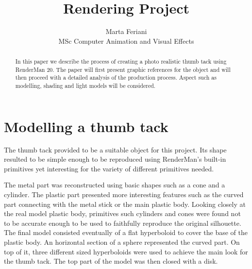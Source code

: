 \documentclass[tog]{acmsiggraph}
\title{Rendering Project}
\author{Marta Feriani\\MSc Computer Animation and Visual Effects}
\begin{document}


\maketitle

\begin{abstract}

In this paper we describe the process of creating a photo realistic thumb tack using RenderMan 20. The paper will first present graphic references for the object and will then proceed with a detailed analysis of the production process.
Aspect such as modelling, shading and light models will be considered.

\end{abstract}

\keywordlist


\copyrightspace



\section{Modelling a thumb tack}

The thumb tack provided to be a suitable object for this project. Its shape resulted to be simple enough to be reproduced using RenderMan's built-in primitives yet interesting for the variety of different primitives needed.

The metal part was reconstructed using basic shapes such as a cone and a cylinder.
The plastic part presented more interesting features such as the curved part connecting with the metal stick or the main plastic body. Looking closely at the real model plastic body, primitives such cylinders and cones were found not to be accurate enough to be used to faithfully reproduce the original silhouette.
The final model consisted eventually of a flat hyperboloid to cover the base of the plastic body. An horizontal section of a sphere represented the curved part. On top of it, three different sized hyperboloids were used to achieve the main look for the thumb tack. The top part of the model was then closed with a disk.
\end{document}
